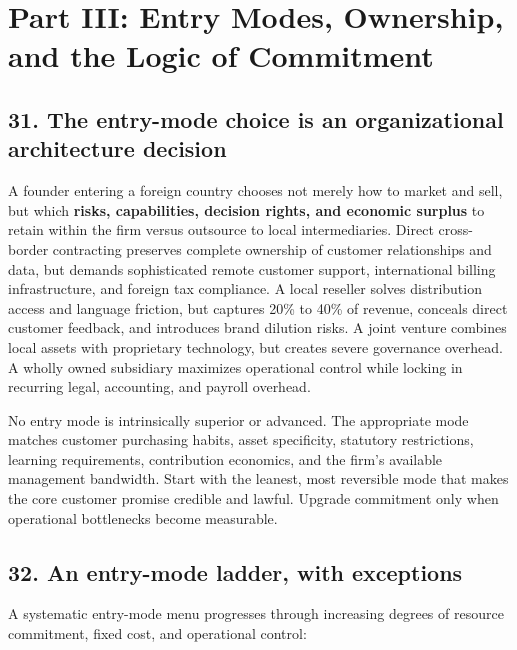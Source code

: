 \section{Part III: Entry Modes, Ownership, and the Logic of Commitment}

\subsection{31. The entry-mode choice is an organizational architecture decision}

A founder entering a foreign country chooses not merely how to market and sell, but which \textbf{risks, capabilities, decision rights, and economic surplus} to retain within the firm versus outsource to local intermediaries. Direct cross-border contracting preserves complete ownership of customer relationships and data, but demands sophisticated remote customer support, international billing infrastructure, and foreign tax compliance. A local reseller solves distribution access and language friction, but captures 20\% to 40\% of revenue, conceals direct customer feedback, and introduces brand dilution risks. A joint venture combines local assets with proprietary technology, but creates severe governance overhead. A wholly owned subsidiary maximizes operational control while locking in recurring legal, accounting, and payroll overhead.

No entry mode is intrinsically superior or advanced. The appropriate mode matches customer purchasing habits, asset specificity, statutory restrictions, learning requirements, contribution economics, and the firm's available management bandwidth. Start with the leanest, most reversible mode that makes the core customer promise credible and lawful. Upgrade commitment only when operational bottlenecks become measurable.

\subsection{32. An entry-mode ladder, with exceptions}

A systematic entry-mode menu progresses through increasing degrees of resource commitment, fixed cost, and operational control:

